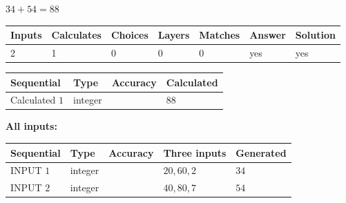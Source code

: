 \documentclass[12pt]{article}
\begin{document}
 
\noindent{}
 
 

$ %
34 +  %
54=   %
88$
 
 
\noindent{}
 
 

 
   
   
   
   
\noindent\begin{tabular}{|l|l|l|l|l|l|l|}
 \hline
Inputs & Calculates & Choices & Layers & Matches & Answer & Solution \\ \hline
 2  & 
 1  & 
 0
  & 
 0  & 
 0  & 
  yes & 
  yes 
  \\ \hline
 \end{tabular}
   
   
   
   
\noindent{}
   
   
  
  
\noindent\begin{tabular}{|l|l|l|l|}
\hline
 Sequential & Type & Accuracy & Calculated \\ 
\hline
 
 
  Calculated $  1 $ & integer &  & 
  $ 88 $ 
 \\  \hline  
 \end{tabular}
   
   
   
   
\noindent\vspace{0.1in}\hspace{-0.08in} {\textbf{\Large{All inputs: }}}
   
   
  
  
\noindent\begin{tabular}{|l|l|l|l|l|}
\hline
 Sequential & Type & Accuracy & Three inputs & Generated \\ 
\hline
 
 
  INPUT $  1 $ & integer &  & $
 20
 , 
 60
 , 
 2
 $ & $ 34 $ 
 \\  \hline  
 
 
  INPUT $  2 $ & integer &  & $
 40
 , 
 80
 , 
 7
 $ & $ 54 $ 
 \\  \hline  
 \end{tabular}
   
   
  
\end{document}
